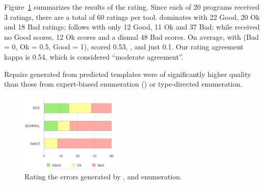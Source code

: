%
Figure~\ref{fig:comparison} summarizes the results of the rating.
%
Since each of 20 programs received 3 ratings, there are a
total of 60 ratings per tool.
%
\toolname dominates with 22 Good, 20 Ok and 18 Bad ratings;
\seminal follows with only 12 Good, 11 Ok and 37 Bad; while
\naive received no Good scores, 12 Ok scores and a
dismal 48 Bad scores.
%
On average, with (Bad = 0, Ok = 0.5, Good = 1),
\toolname scored 0.53, , and \naive
just 0.1.
%
Our rating agreement kappa is 0.54, which is considered ``moderate agreement''.

\begin{framed}
  \noindent Repairs generated from predicted
  templates were of significantly higher quality
  than those from expert-biased enumeration (\seminal)
  or \naive type-directed enumeration.
\end{framed}

\begin{figure}[t]
  \centering
  \includegraphics[height=1.5in]{comparison.png}
  \caption{Rating the errors generated by \toolname, \seminal and \naive enumeration.}
  \label{fig:comparison}
\end{figure}
